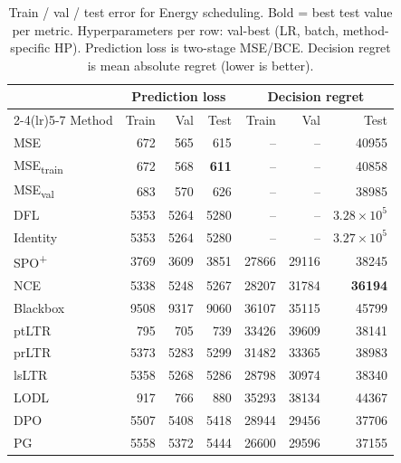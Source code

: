 \begin{table}[t]
\centering
\caption{Train / val / test error for Energy scheduling. Bold = best test value per metric. Hyperparameters per row: val-best (LR, batch, method-specific HP). Prediction loss is two-stage MSE/BCE. Decision regret is mean absolute regret (lower is better).}
\label{tab:err-energy}
\setlength{\tabcolsep}{4pt}
\renewcommand{\arraystretch}{1.05}
\begin{tabular}{@{}lrrrrrr@{}}
\toprule
& \multicolumn{3}{c}{Prediction loss} & \multicolumn{3}{c}{Decision regret} \\
\cmidrule(lr){2-4}\cmidrule(lr){5-7}
Method & Train & Val & Test & Train & Val & Test \\
\midrule
MSE & 672 & 565 & 615 & -- & -- & 40955 \\
MSE\textsubscript{train} & 672 & 568 & \textbf{611} & -- & -- & 40858 \\
MSE\textsubscript{val} & 683 & 570 & 626 & -- & -- & 38985 \\
DFL & 5353 & 5264 & 5280 & -- & -- & $3.28{\times}10^{5}$ \\
Identity & 5353 & 5264 & 5280 & -- & -- & $3.27{\times}10^{5}$ \\
SPO\textsuperscript{+} & 3769 & 3609 & 3851 & 27866 & 29116 & 38245 \\
NCE & 5338 & 5248 & 5267 & 28207 & 31784 & \textbf{36194} \\
Blackbox & 9508 & 9317 & 9060 & 36107 & 35115 & 45799 \\
ptLTR & 795 & 705 & 739 & 33426 & 39609 & 38141 \\
prLTR & 5373 & 5283 & 5299 & 31482 & 33365 & 38983 \\
lsLTR & 5358 & 5268 & 5286 & 28798 & 30974 & 38340 \\
LODL & 917 & 766 & 880 & 35293 & 38134 & 44367 \\
DPO & 5507 & 5408 & 5418 & 28944 & 29456 & 37706 \\
PG & 5558 & 5372 & 5444 & 26600 & 29596 & 37155 \\
\bottomrule
\end{tabular}
\end{table}

